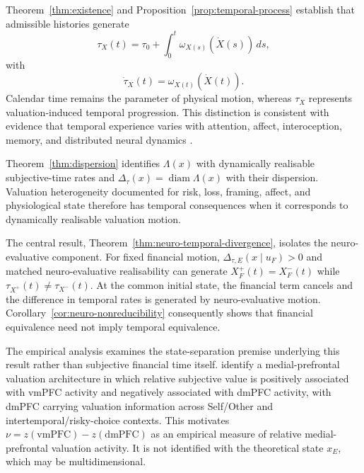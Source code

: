 \documentclass[graybox,natbib]{SNmult}
\providecommand{\1}{}
\renewcommand{\1}{\mathbbm 1}
\begin{document}
Theorem~\ref{thm:existence} and Proposition~\ref{prop:temporal-process}
establish that admissible histories generate
\[
\tau_X(t)
=
\tau_0+\int_0^t\omega_{X(s)}(\dot X(s))\,ds,
\]
with
\[
\dot\tau_X(t)=\omega_{X(t)}(\dot X(t)).
\]
Calendar time remains the parameter of physical motion, whereas \(\tau_X\)
represents valuation-induced temporal progression. This distinction is
consistent with evidence that temporal experience varies with attention,
affect, interoception, memory, and distributed neural dynamics
\citep{BuhusiMeck2005,WittmannVanWassenhove2009,Wittmann2013,
TsaoYousefzadehMeckMoserMoser2022,Buzsaki2026}.

Theorem~\ref{thm:dispersion} identifies \(\Lambda(x)\) with dynamically
realisable subjective-time rates and
\(\Delta_\tau(x)=\operatorname{diam}\Lambda(x)\) with their dispersion.
Valuation heterogeneity documented for risk, loss, framing, affect, and
physiological state
\citep{DeMartinoCamererAdolphs2010,DeMartinoKumaranSeymourDolan2006,
PreuschoffQuartzBossaerts2008,CoatesHerbert2008,
SapienzaZingalesMaestripieri2009,PivaEtAl2019Dataset}
therefore has temporal consequences when it corresponds to dynamically
realisable valuation motion.

The central result, Theorem~\ref{thm:neuro-temporal-divergence}, isolates the
neuro-evaluative component. For fixed financial motion,
\(\Delta_{\tau,E}(x\mid u_F)>0\) and matched neuro-evaluative realisability can
generate \(X_F^+(t)=X_F^-(t)\) while
\(\tau_{X^+}(t)\neq\tau_{X^-}(t)\). At the common initial state, the financial
term cancels and the difference in temporal rates is generated by
neuro-evaluative motion. Corollary~\ref{cor:neuro-nonreducibility} consequently
shows that financial equivalence need not imply temporal equivalence.

The empirical analysis examines the state-separation premise underlying this
result rather than subjective financial time itself. \citet{PivaEtAl2019}
identify a medial-prefrontal valuation architecture in which relative
subjective value is positively associated with vmPFC activity and negatively
associated with dmPFC activity, with dmPFC carrying valuation information
across Self/Other and intertemporal/risky-choice contexts. This motivates
\(\nu=z(\mathrm{vmPFC})-z(\mathrm{dmPFC})\) as an empirical measure of relative
medial-prefrontal valuation activity. It is not identified with the theoretical
state \(x_E\), which may be multidimensional.
\end{document}
